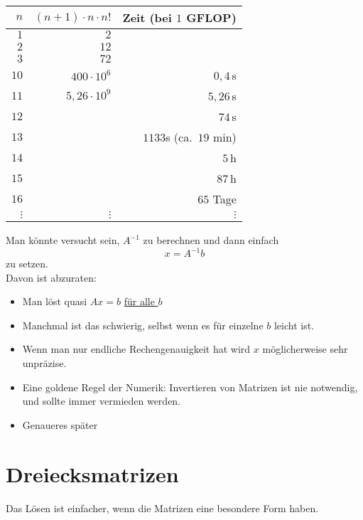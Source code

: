\begin{center}
\begin{tabular}{ r | r | r }
   $n$ & $(n+1)\cdot n \cdot n!$ & Zeit (bei $1$ GFLOP)\\
   \hline
  $1$ & $2$ & \\
  $2$ & $12$ & \\
  $3$ & $ 72$ & \\
  \hline
  $10$ & $400 \cdot 10^6$ & $0{,}4$\,s \\
  $11$ & $5{,}26 \cdot 10^9$ & $5{,}26$\,s \\
  $12$ & & $74$\,s\\
  $13$ & & $1133$s (ca.\ $19$ min)\\
  $14$ & & $5$\,h\\
  $15$ & & $87$\,h\\
  $16$ & & $65$ Tage\\
  $\vdots$ & $\vdots$&$\vdots$
\end{tabular}
\end{center}
Man könnte versucht sein, $A^{-1}$ zu berechnen und dann einfach
\begin{equation*}
x = A^{-1} b
\end{equation*}
zu setzen.
\\Davon ist abzuraten:
\begin{itemize}
\item Man löst quasi $Ax = b$ \underline{für alle $b$} 
\item Manchmal ist das schwierig, selbst wenn es für einzelne $b$ leicht ist.
\item Wenn man nur endliche Rechengenauigkeit hat wird $x$ möglicherweise sehr unpräzise.
\item Eine goldene Regel der Numerik:  Invertieren von Matrizen ist nie notwendig,
   und sollte immer vermieden werden.
\item Genaueres später
\end{itemize}

\section{Dreiecksmatrizen}
Das Lösen ist einfacher, wenn die Matrizen eine besondere Form haben.

\medskip

